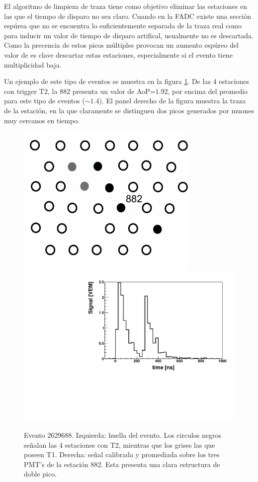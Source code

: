 	El algoritmo de limpieza de traza tiene como objetivo eliminar las estaciones en las que el tiempo de disparo no sea claro. 
	Cuando en la FADC existe una sección espúrea que no se encuentra lo suficientemente separada de la traza real como para inducir un valor de tiempo de disparo artifical, usualmente no es descartada.
	Como la precencia de estos picos múltiples provocan un aumento espúreo del valor de \aop{} es clave descartar estas estaciones, especialmente si el evento tiene multiplicidad baja.
	
	Un ejemplo de este tipo de eventos se muestra en la figura \ref{fig:doublePeakEvent}.
	De las 4 estaciones con trigger T2, la 882 presenta un valor de AoP=1.92, por encima del promedio para este tipo de eventos ($\sim1.4$). 
	El panel derecho de la figura muestra la traza de la estación, en la que claramente se distinguen dos picos generados por muones muy cercanos en tiempo.
	\begin{figure}[ht]
	\begin{center}
	\includegraphics[height=0.35\textwidth]{fig/seleccionAuger/2629688_nice}
	\hfill
	\includegraphics[height=0.35\textwidth]{fig/seleccionAuger/ev2629688_pmtAvg_anode}
	\caption{Evento 2629688. Izquierda: huella del evento. Los circulos negros señalan las 4 estaciones con T2, mientras que los grises las que poseen T1. Derecha: señal calibrada y promediada sobre los tres PMT's de la estación 882. Esta presenta una clara estructura de doble pico. }
	\label{fig:doublePeakEvent}
	\end{center}
	\end{figure}
	
